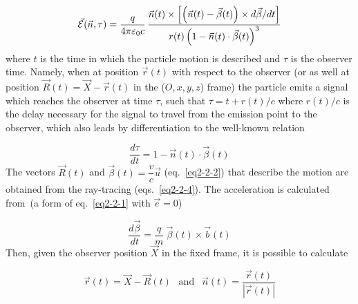 \begin{equation}
\vec \Ecal (\vec{n}, \tau) = 
	\dfrac{q}{4\pi\varepsilon_0c}\, 
	\dfrac{\vec{n}(t) \times \left[
		\left(\vec{n}(t)- \vec{\beta}(t) \right) 
		\times d\vec{\beta}/dt \right]}%
	{r(t) \left(1 - \vec{n}(t)\cdot\vec{\beta}(t) \right)^3}
 \label{eqN4.1}
\end{equation}
%
where $t$ is the time in which the particle motion is described and $\tau$ is the
observer time. Namely, when at position $\vec{r}(t)$ with respect to the observer (or as
well at position $\vec{R}(t) = \vec{X} - \vec{r}(t)$ in the ($O, x, y, z$) frame) the
particle emits a signal which reaches the observer at time $\tau$, such that $\tau = t +
r(t)/c$ where  $r(t)/c$ is the delay necessary for the signal to travel from the
emission point to the observer, which also leads by differentiation to the well-known
 relation

\begin{equation}
\dfrac{d\tau}{dt} = 1 - \vec{n}(t) \cdot \vec{\beta}(t)  \label{eqN4.2}
\end{equation} 
%
\noindent The vectors $\vec{R}(t)$ and $\vec{\beta}(t) = \dfrac{v}{c} \vec u$ (eq.~\ref{eq2-2-2}) that describe the motion are obtained from the ray-tracing (eqs.~\ref{eq2-2-4}). The acceleration is calculated  from~(a form of eq.~\ref{eq2-2-1} with $\vec e=0$)

\begin{equation}
\dfrac{d\vec{\beta}}{dt} = \dfrac{q}{m}~\vec{\beta}(t) \times \vec{b}(t) \label{eqN4.3}
\end{equation} %
%
\noindent Then, given the observer position $\vec{X}$ in the fixed frame, it is possible to calculate

\begin{equation}
\vec{r}(t) = \vec{X} - \vec R(t) ~ ~ \text{ and } ~ ~ \vec{n}(t) = \dfrac{\vec{r}(t)}{ |\vec{r}(t)|} \label{eqN4.4}
\end{equation} %




